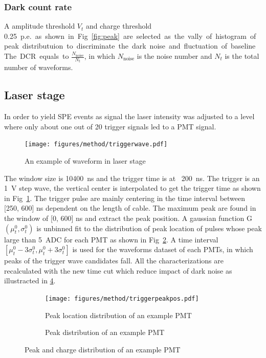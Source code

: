 \subsubsection{Dark count rate}
A amplitude threshold $V_{t}$ and charge threshold \SI{0.25}{p.e.} as shown in Fig~\ref{fig:peak} are selected as the vally of histogram of peak distributuion to discriminate the dark noise and fluctuation of baseline. The DCR equals to $\frac{N_{\mathrm{noise}}}{N_{t}}$, in which $N_{\mathrm{noise}}$ is the noise number and $N_{t}$ is the total number of waveforms.

\subsection{Laser stage}
In order to yield SPE events as signal the laser intensity was adjusted to a level where only
about one out of 20 trigger signals led to a PMT signal.
\begin{figure}[!htbp]
    \centering
    \texttt{[image: figures/method/triggerwave.pdf]}
    \caption{An example of waveform in laser stage}
    \label{fig:triggertime}
\end{figure}
The window size is \SI{10400}{ns} and the trigger time is at ~\SI{200}{ns}. The trigger is an \SI{1}{V} step wave, the vertical center is interpolated to get the trigger time as shown in Fig~\ref{fig:triggertime}. The trigger pulse are mainly centering in the time interval between [250, 600] ns dependent on the length of cable. The maximum peak are found in the window of [0, 600] ns and extract the peak position. A gaussian function G$(\mu_t^0,\sigma_t^0)$ is unbinned fit to the distribution of peak location of pulses whose peak large than \SI{5}{ADC} for each PMT as shown in Fig~\ref{fig:peaklocation}. A time interval $[\mu_t^0-3\sigma_t^0, \mu_t^0+3\sigma_t^0]$ is used for the waveforms dataset of each PMTs, in which peaks of the trigger wave candidates fall. All the characterizations are recalculated with the new time cut which reduce impact of dark noise as illustracted in \ref{fig:peakselected}.
\begin{figure}[!htbp]
    \centering
    \begin{subfigure}[t]{0.45\textwidth}
        \texttt{[image: figures/method/triggerpeakpos.pdf]}
        \caption{Peak location distribution of an example PMT}%
        \label{fig:peaklocation}
    \end{subfigure}
    \begin{subfigure}[t]{0.45\textwidth}
        \caption{Peak distribution of an example PMT}%
        \label{fig:peakselected}
    \end{subfigure}
    \caption{Peak and charge distribution of an example PMT}
\end{figure}


